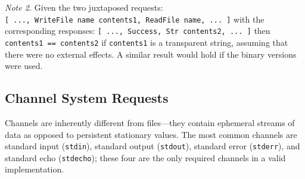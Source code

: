 {\em Note 2.} Given the two juxtaposed requests:
\bprog
\mbox{\tt [\ ...,\ WriteFile\ name\ contents1,\ ReadFile\ name,\ ...\ ]}
\eprog
with the corresponding responses:
\bprog
\mbox{\tt [\ ...,\ Success,\ Str\ contents2,\ ...\ ]}
\eprog
then \mbox{\tt contents1\ ==\ contents2} if \mbox{\tt contents1} is a transparent string,
assuming that there were no external effects.  A
similar result would hold if the binary versions were used.


\subsection{Channel System Requests}
\label{channel-system-requests}

Channels are inherently different from files---they contain
ephemeral streams of data as opposed to persistent stationary
values.  The most common channels are standard input (\mbox{\tt stdin}),
standard output (\mbox{\tt stdout}), standard error (\mbox{\tt stderr}), and standard
echo (\mbox{\tt stdecho}); these four are the only required channels
in a valid implementation.

